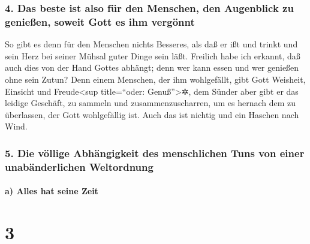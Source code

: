 \hypertarget{das-beste-ist-also-fuxfcr-den-menschen-den-augenblick-zu-genieuxdfen-soweit-gott-es-ihm-verguxf6nnt}{%
\subsubsection{4. Das beste ist also für den Menschen, den Augenblick zu
genießen, soweit Gott es ihm
vergönnt}\label{das-beste-ist-also-fuxfcr-den-menschen-den-augenblick-zu-genieuxdfen-soweit-gott-es-ihm-verguxf6nnt}}

So gibt es denn für den Menschen nichts Besseres, als daß
er ißt und trinkt und sein Herz bei seiner Mühsal guter Dinge sein läßt.
Freilich habe ich erkannt, daß auch dies von der Hand Gottes abhängt;
denn wer kann essen und wer genießen ohne sein Zutun?
Denn einem Menschen, der ihm wohlgefällt, gibt Gott
Weisheit, Einsicht und Freude\textless sup title=``oder:
Genuß''\textgreater✲, dem Sünder aber gibt er das leidige Geschäft, zu
sammeln und zusammenzuscharren, um es hernach dem zu überlassen, der
Gott wohlgefällig ist. Auch das ist nichtig und ein Haschen nach Wind.

\hypertarget{die-vuxf6llige-abhuxe4ngigkeit-des-menschlichen-tuns-von-einer-unabuxe4nderlichen-weltordnung}{%
\subsubsection{5. Die völlige Abhängigkeit des menschlichen Tuns von
einer unabänderlichen
Weltordnung}\label{die-vuxf6llige-abhuxe4ngigkeit-des-menschlichen-tuns-von-einer-unabuxe4nderlichen-weltordnung}}

\hypertarget{a-alles-hat-seine-zeit}{%
\paragraph{a) Alles hat seine Zeit}\label{a-alles-hat-seine-zeit}}

\hypertarget{section-2}{%
\section{3}\label{section-2}}

